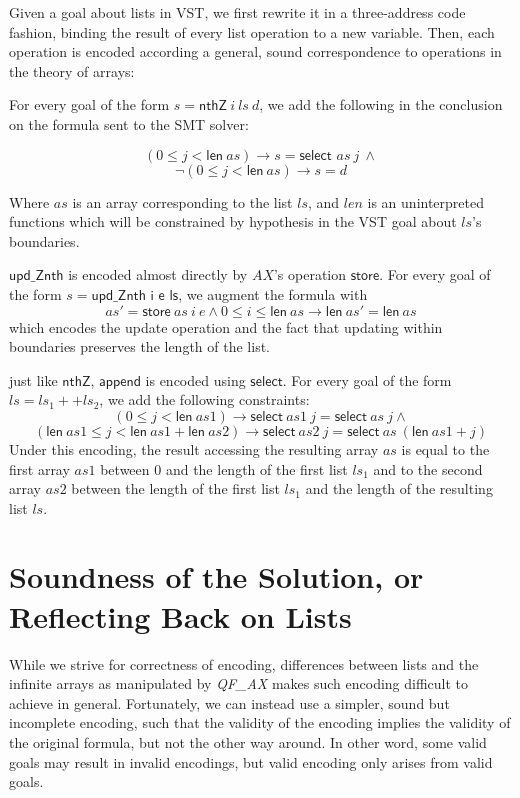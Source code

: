\documentclass[onecolumn, preprint]{sigplanconf}
\begin{document}
Given a goal about lists in VST, we first rewrite it in a three-address code fashion, binding the result of every list operation to a new variable. Then, each operation is encoded according a general, sound correspondence to operations in the theory of arrays:

For every goal of the form $s = \textsf{nthZ}\ i\ ls\ d$, we add the following in the conclusion on the formula sent to the SMT solver:

$$ (0 \leq j < \textsf{len}\ as) \to s = \textsf{select } as\ j\ \wedge$$
$$\neg (0 \leq j < \textsf{len}\ as) \to s = d $$

Where $as$ is an array corresponding to the list $ls$, and $len$ is an uninterpreted functions which will be constrained by hypothesis in the VST goal about $ls$'s boundaries.


$\textsf{upd\_Znth}$ is encoded almost directly by $AX$'s operation $\textsf{store}$. For every goal of the form $s = \textsf{upd\_Znth\ i\ e\ ls}$, we augment the formula with
$$ as' = \textsf{store}\ as\ i\ e \wedge 0 \leq i \leq \textsf{len}\ as \to \textsf{len}\ as' = \textsf{len}\ as$$
which encodes the update operation and the fact that updating within boundaries preserves the length of the list.


just like $\textsf{nthZ}$, $\textsf{append}$ is encoded using $\textsf{select}$. For every goal of the form $ls = ls_1 ++ ls_2$, we add the following constraints:
$$(0 \leq j < \textsf{len}\ as1) \to \textsf{select}\ as1\ j = \textsf{select}\ as\ j \wedge $$
$$(\textsf{len}\ as1 \leq j < \textsf{len}\ as1 + \textsf{len}\ as2) \to \textsf{select}\ as2\ j = \textsf{select}\ as\ (\textsf{len}\ as1 + j)$$
Under this encoding, the result accessing the resulting array $as$ is equal to the first array $as1$ between $0$ and the length of the first list $ls_1$ and to the second array $as2$ between the length of the first list $ls_1$ and the length of the resulting list $ls$.




\section{Soundness of the Solution, or Reflecting Back on Lists}
\label{sec:proofs}
While we strive for correctness of encoding, differences between lists
and the infinite arrays as manipulated by \emph{QF\_AX} makes such encoding difficult to achieve in general. 
Fortunately, we can instead use a simpler, sound but incomplete encoding, such that the validity 
of the encoding implies the validity of the original formula, but not the other way around.
In other word, some valid goals may result in invalid encodings, but valid encoding only arises from valid goals.
\end{document}
